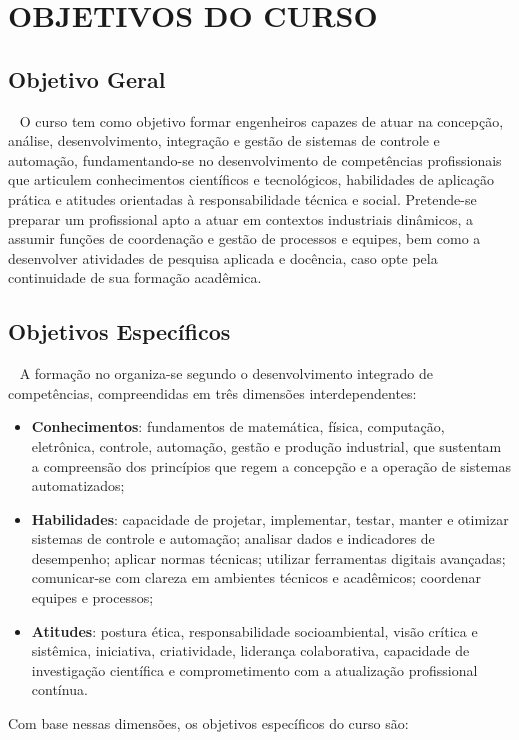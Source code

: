 \section{OBJETIVOS DO CURSO}
\label{OBJETIVOS}

\subsection{Objetivo Geral}
~
O curso tem como objetivo formar engenheiros capazes de atuar na concepção, análise, desenvolvimento, integração e gestão de sistemas de controle e automação, fundamentando-se no desenvolvimento de competências profissionais que articulem conhecimentos científicos e tecnológicos, habilidades de aplicação prática e atitudes orientadas à responsabilidade técnica e social. Pretende-se preparar um profissional apto a atuar em contextos industriais dinâmicos, a assumir funções de coordenação e gestão de processos e equipes, bem como a desenvolver atividades de pesquisa aplicada e docência, caso opte pela continuidade de sua formação acadêmica.

\subsection{Objetivos Específicos}
~
A formação no \NOMECURSO organiza-se segundo o desenvolvimento integrado de competências, compreendidas em três dimensões interdependentes:

\begin{itemize}
	\item \textbf{Conhecimentos}: fundamentos de matemática, física, computação, eletrônica, controle, automação, gestão e produção industrial, que sustentam a compreensão dos princípios que regem a concepção e a operação de sistemas automatizados;
	\item \textbf{Habilidades}: capacidade de projetar, implementar, testar, manter e otimizar sistemas de controle e automação; analisar dados e indicadores de desempenho; aplicar normas técnicas; utilizar ferramentas digitais avançadas; comunicar-se com clareza em ambientes técnicos e acadêmicos; coordenar equipes e processos;
	\item \textbf{Atitudes}: postura ética, responsabilidade socioambiental, visão crítica e sistêmica, iniciativa, criatividade, liderança colaborativa, capacidade de investigação científica e comprometimento com a atualização profissional contínua.
\end{itemize}

Com base nessas dimensões, os objetivos específicos do curso são:

